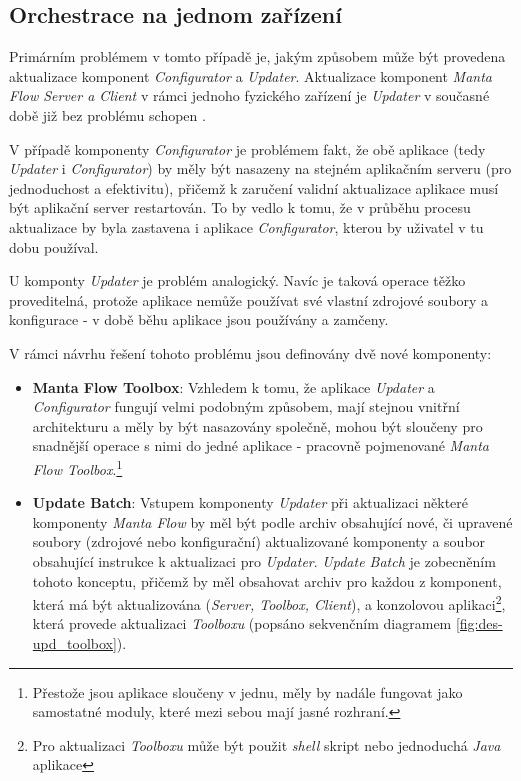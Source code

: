\subsection{Orchestrace na jednom zařízení}
\label{sec:des_orchestration_singlenode}
Primárním problémem v tomto případě je, jakým způsobem může být provedena aktualizace komponent \textit{Configurator} a \textit{Updater}. Aktualizace komponent \textit{Manta Flow Server a Client} v rámci jednoho fyzického zařízení je \textit{Updater} v současné době již bez problému schopen \cite{Gondek16}.

V případě komponenty \textit{Configurator} je problémem fakt, že obě aplikace (tedy \textit{Updater} i \textit{Configurator}) by měly být nasazeny na stejném aplikačním serveru (pro jednoduchost a efektivitu), přičemž k zaručení validní aktualizace aplikace musí být aplikační server restartován. To by vedlo k tomu, že v průběhu procesu aktualizace by byla zastavena i aplikace \textit{Configurator}, kterou by uživatel v tu dobu používal.

U komponty \textit{Updater} je problém analogický. Navíc je taková operace těžko proveditelná, protože aplikace nemůže používat své vlastní zdrojové soubory a konfigurace - v době běhu aplikace jsou používány a zamčeny.

V rámci návrhu řešení tohoto problému jsou definovány dvě nové komponenty:

\begin{itemize}
   \item{\textbf{Manta Flow Toolbox}}: Vzhledem k tomu, že aplikace \textit{Updater} a \textit{Configurator} fungují velmi podobným způsobem, mají stejnou vnitřní architekturu a měly by být nasazovány společně, mohou být sloučeny pro snadnější operace s nimi do jedné aplikace - pracovně pojmenované \textit{Manta Flow Toolbox}.\footnote{Přestože jsou aplikace sloučeny v jednu, měly by nadále fungovat jako samostatné moduly, které mezi sebou mají jasné rozhraní.}
   \item{\textbf{Update Batch}}: Vstupem komponenty \textit{Updater} při aktualizaci některé komponenty \textit{Manta Flow} by měl být podle \cite{Gondek16} archiv obsahující nové, či upravené soubory (zdrojové nebo konfigurační) aktualizované komponenty a soubor obsahující instrukce k aktualizaci pro \textit{Updater}.
   \textit{Update Batch} je zobecněním tohoto konceptu, přičemž by měl obsahovat archiv pro každou z komponent, která má být aktualizována (\textit{Server, Toolbox, Client}), a konzolovou aplikaci\footnote{Pro aktualizaci \textit{Toolboxu} může být použit \textit{shell} skript nebo jednoduchá \textit{Java} aplikace}, která provede aktualizaci \textit{Toolboxu} (popsáno sekvenčním diagramem \ref{fig:des-upd_toolbox}).
\end{itemize}

